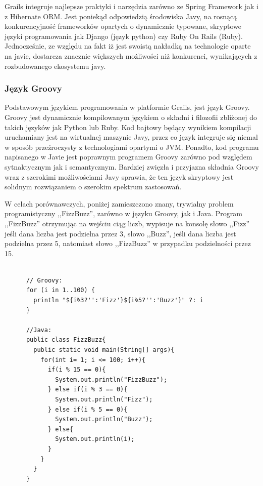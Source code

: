    Grails integruje najlepsze praktyki i narzędzia zarówno ze Spring Framework jak i z Hibernate ORM. Jest poniekąd odpowiedzią środowiska Javy, na rosnącą konkurencyjność frameworków opartych o dynamicznie typowane, skryptowe języki programowania jak Django (język python) czy Ruby On Rails (Ruby). Jednocześnie, ze względu na fakt iż jest swoistą nakładką na technologie oparte na javie, dostarcza znacznie większych możliwości niż konkurenci, wynikających z rozbudowanego ekosystemu javy.


    \subsubsection{Język Groovy}

      Podstawowym językiem programowania w platformie Grails, jest język Groovy. Groovy jest dynamicznie kompilowanym językiem o składni i filozofii zbliżonej do takich języków jak Python lub Ruby. Kod bajtowy będący wynikiem kompilacji uruchamiany jest na wirtualnej maszynie Javy, przez co język integruje się niemal w sposób przeźroczysty z technologiami opartymi o JVM. Ponadto, kod programu napisanego w Javie jest poprawnym programem Groovy zarówno pod względem sytnaktycznym jak i semantycznym. Bardziej zwięzła i przyjazna składnia Groovy wraz z szerokimi możliwościami Javy sprawia, że ten język skryptowy jest solidnym rozwiązaniem o szerokim spektrum zastosowań.

      W celach porównawczych, poniżej zamieszczono znany, trywialny problem programistyczny ,,FizzBuzz'', zarówno w języku Groovy, jak i Java. Program ,,FizzBuzz'' otrzymując na wejściu ciąg liczb, wypisuje na konsolę słowo ,,Fizz'' jeśli dana liczba jest podzielna przez 3, słowo ,,Buzz'', jeśli dana liczba jest podzielna przez 5, natomiast słowo ,,FizzBuzz'' w przypadku podzielności przez 15.

      \begin{lstlisting}[caption={program FizzBuzz}, label={lst:FizzBuzz}]

      // Groovy:
      for (i in 1..100) {
        println "${i%3?'':'Fizz'}${i%5?'':'Buzz'}" ?: i
      }    

      //Java:
      public class FizzBuzz{
        public static void main(String[] args){
          for(int i= 1; i <= 100; i++){
            if(i % 15 == 0){
              System.out.println("FizzBuzz");
            } else if(i % 3 == 0){
              System.out.println("Fizz");
            } else if(i % 5 == 0){
              System.out.println("Buzz");
            } else{
              System.out.println(i);
            }
          }
        }
      }

    \end{lstlisting}

